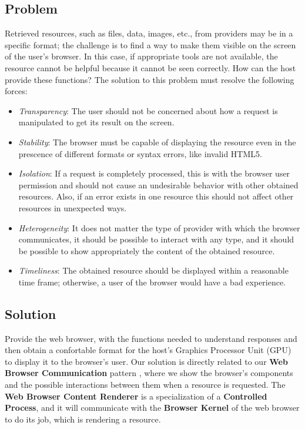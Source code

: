 \documentclass[]{acmlarge}
\begin{document}
  \subsection*{Problem}
  Retrieved resources, such as files, data, images, etc., from providers may be in a specific format; the challenge is to find a way to make them visible on the screen of the user's browser. In this case, if appropriate tools are not available, the resource cannot be helpful because it cannot be seen correctly. How can the host provide these functions? The solution to this problem must resolve the following forces:
  \begin{itemize}\leftskip0.8em
    \item \textit{Transparency}: The user should not be concerned about how a request is manipulated to get its result on the screen.
    \item \textit{Stability}: The browser must be capable of displaying the resource even in the prescence of different formats or syntax errors, like invalid HTML5.
    \item \textit{Isolation}: If a request is completely processed, this is with the browser user permission and should not cause an undesirable behavior with other obtained resources. Also, if an error exists in one resource this should not affect other resources in unexpected ways.
    \item \textit{Heterogeneity}: It does not matter the type of provider with which the browser communicates, it should be possible to interact with any type, and it should be possible to show appropriately the content of the obtained resource.
    \item \textit{Timeliness}: The obtained resource should be displayed within a reasonable time frame; otherwise, a user of the browser would have a bad experience.
  \end{itemize}

  \subsection*{Solution}
  Provide the web browser, with the functions needed to understand responses and then obtain a confortable format for the host's Graphics Processor Unit (GPU) to display it to the browser's user. Our solution is directly related to our \textbf{Web Browser Communication} pattern \cite{silva2015} %
  , where we show the browser's components and the possible interactions between them when a resource is requested. The \textbf{Web Browser Content Renderer} is a specialization of a \textbf{Controlled Process}, and it will communicate with the \textbf{Browser Kernel} of the web browser to do its job, which is rendering a resource.
\end{document}
